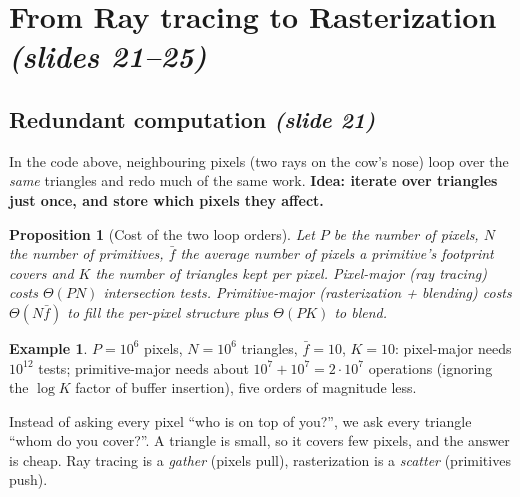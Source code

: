 \documentclass[11pt,a4paper]{article}
\newcommand{\sr}[1]{\texorpdfstring{\emph{(#1)}}{(#1)}}
\theoremstyle{definition}
\newtheorem{example}[definition]{Example}
\theoremstyle{algstyle}
\theoremstyle{plain}
\newtheorem{proposition}[definition]{Proposition}
\theoremstyle{remark}
\begin{document}
\section{From Ray tracing to Rasterization \sr{slides 21--25}}
\subsection{Redundant computation \sr{slide 21}}
In the code above, neighbouring pixels (two rays on the cow's nose) loop over the \emph{same} triangles and redo much of the same work. \textbf{Idea: iterate over triangles just once, and store which pixels they affect.}

\begin{proposition}[Cost of the two loop orders]
Let $P$ be the number of pixels, $N$ the number of primitives, $\bar f$ the average number of pixels a primitive's footprint covers and $K$ the number of triangles kept per pixel. Pixel-major (ray tracing) costs $\Theta(PN)$ intersection tests. Primitive-major (rasterization + blending) costs $\Theta(N\bar f)$ to fill the per-pixel structure plus $\Theta(PK)$ to blend.
\end{proposition}
\begin{example}
$P=10^6$ pixels, $N=10^6$ triangles, $\bar f=10$, $K=10$: pixel-major needs $10^{12}$ tests; primitive-major needs about $10^{7}+10^{7}=2\cdot10^{7}$ operations (ignoring the $\log K$ factor of buffer insertion), five orders of magnitude less.
\end{example}
\begin{intuition}
Instead of asking every pixel ``who is on top of you?'', we ask every triangle ``whom do you cover?''. A triangle is small, so it covers few pixels, and the answer is cheap. Ray tracing is a \emph{gather} (pixels pull), rasterization is a \emph{scatter} (primitives push).
\end{intuition}
\end{document}
